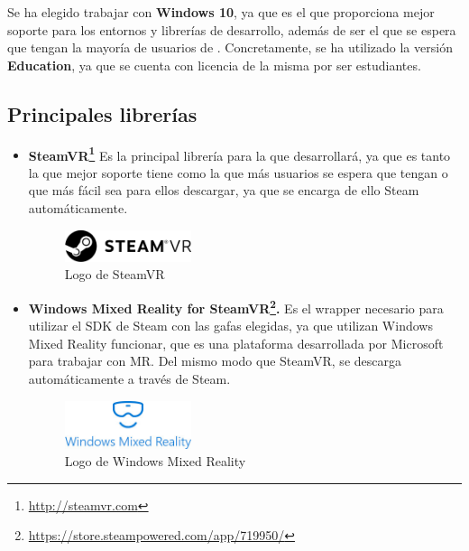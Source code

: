 Se ha elegido trabajar con \textbf{Windows 10}, ya que es el que proporciona mejor soporte para los entornos y librerías de desarrollo, además de ser el que se espera que tengan la mayoría de usuarios de \MineRVa. Concretamente, se ha utilizado la versión \textbf{Education}, ya que se cuenta con licencia de la misma por ser estudiantes.

\subsection{Principales librerías}

\begin{itemize}
    \item \textbf{SteamVR\footnote{\url{http://steamvr.com}}} Es la principal librería para la que desarrollará, ya que es tanto la que mejor soporte tiene como la que más usuarios se espera que tengan o que más fácil sea para ellos descargar, ya que se encarga de ello Steam automáticamente.
    
\begin{figure}[!h]
\begin{center}
\includegraphics[width=0.35\textwidth]{imagenes/4/steamvr-logo.jpg}
\caption{Logo de SteamVR}
\label{fig:steamvr-logo}
\end{center}
\end{figure}

    \item \textbf{Windows Mixed Reality for SteamVR\footnote{\url{https://store.steampowered.com/app/719950/}}.} Es el wrapper necesario para utilizar el SDK de Steam con las gafas elegidas, ya que utilizan Windows Mixed Reality funcionar, que es una plataforma desarrollada por Microsoft para trabajar con \acs{MR}. Del mismo modo que SteamVR, se descarga automáticamente a través de Steam.

\begin{figure}[!h]
\begin{center}
\includegraphics[width=0.35\textwidth]{imagenes/4/wmr-logo.jpg}
\caption{Logo de Windows Mixed Reality}
\label{fig:wmr-logo}
\end{center}
\end{figure}


\end{itemize}

